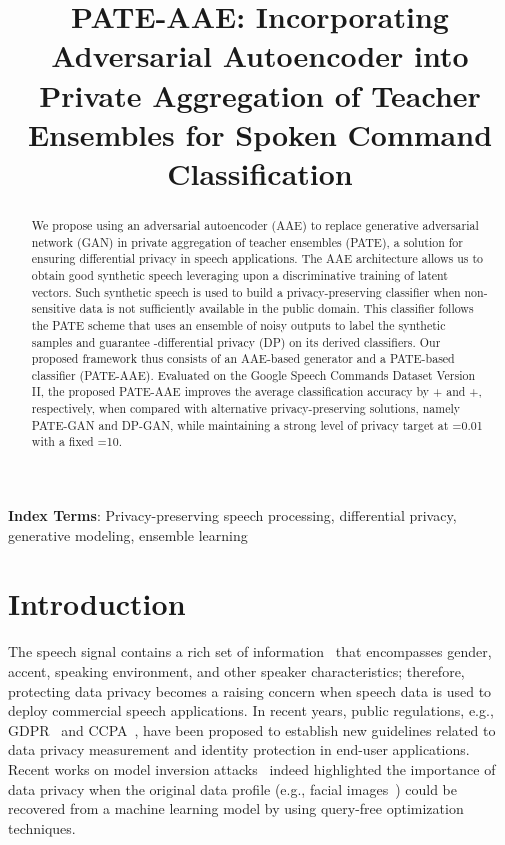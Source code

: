 \documentclass[a4paper]{article}
\title{PATE-AAE: Incorporating Adversarial Autoencoder into Private Aggregation of Teacher Ensembles for Spoken Command Classification}
\begin{document}
\maketitle
\begin{abstract}
  We propose using an adversarial autoencoder (AAE) to replace generative adversarial network (GAN) in private aggregation of teacher ensembles (PATE), a solution for ensuring differential privacy in speech applications. The AAE architecture allows us to obtain good synthetic speech leveraging upon a discriminative training of latent vectors. Such synthetic speech is used to build a privacy-preserving classifier when non-sensitive data is  not sufficiently available in the public domain. This classifier follows the PATE scheme that uses an ensemble of noisy outputs to label the synthetic samples and guarantee -differential privacy (DP) on its derived classifiers.
  Our proposed framework thus consists of an AAE-based generator and a PATE-based classifier (PATE-AAE). Evaluated on the Google Speech Commands Dataset Version II, the proposed PATE-AAE improves the average classification accuracy by + and +, respectively, when compared with alternative privacy-preserving solutions, namely PATE-GAN and DP-GAN, while maintaining a strong level of privacy target at =0.01 with a fixed =10.
\end{abstract}
\noindent\textbf{Index Terms}: Privacy-preserving speech processing, differential privacy, generative modeling, ensemble learning

\section{Introduction}
The speech signal contains a rich set of information~\cite{pathak2013privacy} that encompasses gender, accent, speaking environment, and other speaker characteristics; therefore, protecting data privacy becomes a raising concern when speech data is used to deploy commercial speech applications. In recent years, public regulations, e.g., GDPR~\cite{voigt2017eu} and CCPA~\cite{shatz2020california}, have been proposed to establish new guidelines related to data privacy measurement and identity protection in end-user applications. Recent works on model inversion attacks~\cite{fredrikson2015model, carlini2020extracting} indeed highlighted the importance of data privacy when the original data profile (e.g., facial images~\cite{fredrikson2015model}) could be recovered from a machine learning model by using query-free optimization techniques.
\end{document}
